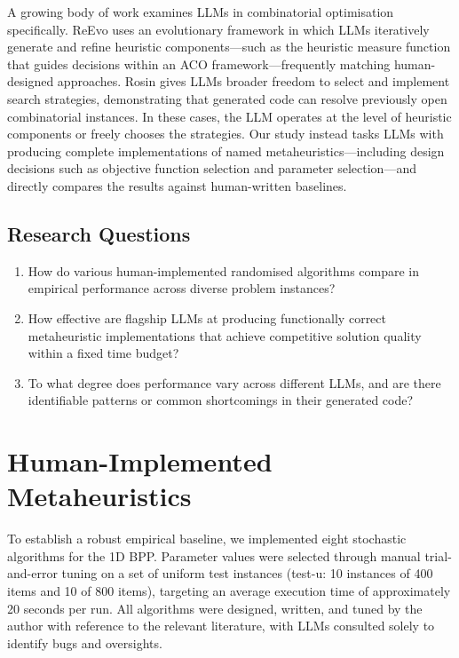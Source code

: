 \documentclass[11pt]{article}
\begin{document}
A growing body of work examines LLMs in combinatorial optimisation specifically. ReEvo \cite{reevo} uses an evolutionary framework in which LLMs iteratively generate and refine heuristic components---such as the heuristic measure function that guides decisions within an ACO framework---frequently matching human-designed approaches. Rosin \cite{rosin2025} gives LLMs broader freedom to select and implement search strategies, demonstrating that generated code can resolve previously open combinatorial instances. In these cases, the LLM operates at the level of heuristic components or freely chooses the strategies. Our study instead tasks LLMs with producing complete implementations of named metaheuristics---including design decisions such as objective function selection and parameter selection---and directly compares the results against human-written baselines.

\subsection{Research Questions}

\begin{enumerate}
    \item How do various human-implemented randomised algorithms compare in empirical performance across diverse problem instances?
    \item How effective are flagship LLMs at producing functionally correct metaheuristic implementations that achieve competitive solution quality within a fixed time budget?
    \item To what degree does performance vary across different LLMs, and are there identifiable patterns or common shortcomings in their generated code?
\end{enumerate}

\section{Human-Implemented Metaheuristics}

To establish a robust empirical baseline, we implemented eight stochastic algorithms for the 1D BPP. Parameter values were selected through manual trial-and-error tuning on a set of uniform test instances (test-u: 10 instances of 400 items and 10 of 800 items), targeting an average execution time of approximately 20 seconds per run. All algorithms were designed, written, and tuned by the author with reference to the relevant literature, with LLMs consulted solely to identify bugs and oversights.
\end{document}
